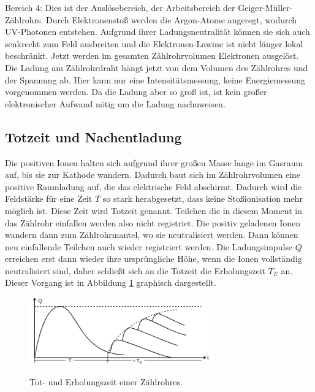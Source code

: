 Bereich 4: Dies ist der Auslösebereich, der Arbeitsbereich der Geiger-Müller-Zählrohrs.
Durch Elektronenstoß werden die Argon-Atome angeregt, wodurch UV-Photonen entstehen. Aufgrund
ihrer Ladungsneutralität können sie sich auch senkrecht zum Feld ausbreiten und die
Elektronen-Lawine ist nicht länger lokal beschränkt. Jetzt werden im gesamten
Zählrohrvolumen Elektronen ausgelöst. Die Ladung am Zählrohrdraht hängt jetzt von
dem Volumen des Zählrohres und der Spannung ab. Hier kann nur eine Intensitätsmessung, keine
Energiemessung vorgenommen werden. Da die Ladung aber so groß ist, ist kein großer
elektronischer Aufwand nötig um die Ladung nachuweisen.\\

\subsection{Totzeit und Nachentladung}
Die positiven Ionen halten sich aufgrund ihrer großen Masse lange im Gasraum auf, bis
sie zur Kathode wandern. Dadurch baut sich im Zählrohrvolumen eine positive
Raumladung auf, die das elektrische Feld abschirmt. Dadurch wird die Feldstärke
für eine Zeit $T$ so stark herabgesetzt, dass keine Stoßionisation mehr
möglich ist. Diese Zeit wird Totzeit genannt. Teilchen die in diesem Moment in das
Zählrohr einfallen werden also nicht registriet. Die positiv geladenen Ionen wandern dann
zum Zählrohrmantel, wo sie neutralisiert werden. Dann können neu einfallende Teilchen auch
wieder registriert werden. Die Ladungsimpulse $Q$ erreichen erst dann wieder ihre
ursprüngliche Höhe, wenn die Ionen vollständig neutralisiert sind, daher schließt sich an
die Totzeit die Erholungszeit $T_E$ an. Dieser Vorgang ist in Abbildung \ref{fig:tot}
graphisch dargestellt.

\begin{figure}
  \centering
  \includegraphics[width=8cm]{tot.png}
  \caption{Tot- und Erholungszeit einer Zählrohres.}
  \label{fig:tot}
  \cite{skript}
\end{figure}

